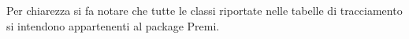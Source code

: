 Per chiarezza si fa notare che tutte le classi riportate nelle tabelle di tracciamento si intendono appartenenti al package Premi.





